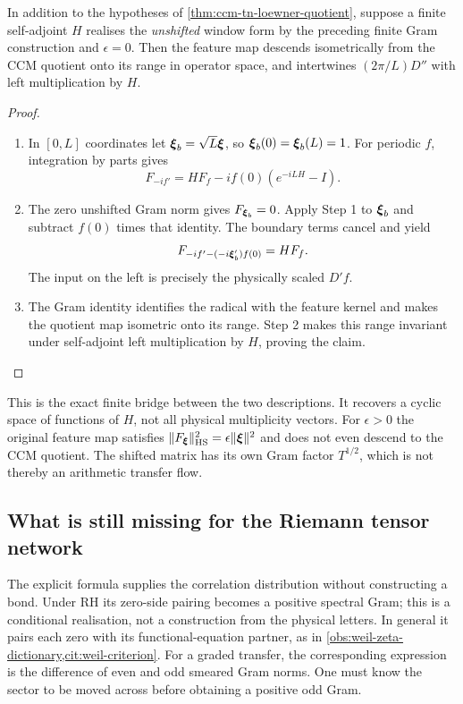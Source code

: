 \begin{proposition}
\label{prop:ccm-tn-exact-continuous-intertwiner}
In addition to the hypotheses of
\cref{thm:ccm-tn-loewner-quotient}, suppose a finite self-adjoint $H$
realises the \emph{unshifted} window form by the preceding finite
Gram construction and $\epsilon=0$. Then the feature map descends
isometrically from the CCM quotient onto its range in operator space,
and intertwines $(2\pi/L)D''$ with left multiplication by $H$.
\end{proposition}
\begin{proof}
\begin{enumerate}
\item[$\langle1\rangle$1.] In $[0,L]$ coordinates let
$\boldsymbol{\xi}_b=\sqrt L\boldsymbol{\xi}$, so $\boldsymbol{\xi}_b(0)=\boldsymbol{\xi}_b(L)=1$.
For periodic $f$, integration by parts gives
\[
 F_{-if'}=HF_f-if(0)(e^{-iLH}-I).
\]
\item[$\langle1\rangle$2.] The zero unshifted Gram norm gives
$F_{\boldsymbol{\xi}_b}=0$. Apply Step 1 to $\boldsymbol{\xi}_b$ and subtract $f(0)$
times that identity. The boundary terms cancel and yield
\[
 F_{-if'-(-i\boldsymbol{\xi}_b')f(0)}=HF_f.
\]
The input on the left is precisely the physically scaled $D'f$.
\item[$\langle1\rangle$3.] The Gram identity identifies the radical
with the feature kernel and makes the quotient map isometric onto
its range. Step 2 makes this range invariant under self-adjoint
left multiplication by $H$, proving the claim.
\end{enumerate}
\end{proof}

This is the exact finite bridge between the two descriptions. It
recovers a cyclic space of functions of $H$, not all physical
multiplicity vectors. For $\epsilon>0$ the original feature map
satisfies $\|F_{\boldsymbol{\xi}}\|_{\mathrm{HS}}^2=\epsilon\|\boldsymbol{\xi}\|^2$ and does
not even descend to the CCM quotient. The shifted matrix has its own
Gram factor $T^{1/2}$, which is not thereby an arithmetic transfer flow.

\subsection{What is still missing for the Riemann tensor network}

The explicit formula supplies the correlation distribution without
constructing a bond. Under RH its zero-side pairing becomes a positive
spectral Gram; this is a conditional realisation, not a construction
from the physical letters. In general it pairs each zero with its
functional-equation partner, as in
\cref{obs:weil-zeta-dictionary,cit:weil-criterion}.
For a graded transfer, the corresponding expression is the difference
of even and odd smeared Gram norms. One must know the sector to be
moved across before obtaining a positive odd Gram.

